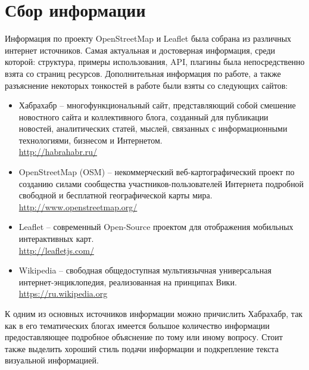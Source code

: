 \documentclass[a4paper, 14pt]{extreport}
\begin{document}
    \chapter{Сбор информации}
    Информация по проекту OpenStreetMap и Leaflet была собрана из различных
    интернет источников. Самая актуальная и достоверная информация, среди
    которой: структура, примеры использования, API, плагины была
    непосредственно взята со страниц ресурсов. Дополнительная информация по
    работе, а также разъяснение некоторых тонкостей в работе были взяты со
    следующих сайтов:
    \begin{itemize}
        \item Хабрахабр -- многофункциональный сайт, представляющий собой
            смешение новостного сайта и коллективного блога, созданный для
            публикации новостей, аналитических статей, мыслей, связанных с
            информационными технологиями, бизнесом и Интернетом.\\
            \url{http://habrahabr.ru/}
        \item OpenStreetMap (OSM) -- некоммерческий веб-картографический проект
            по созданию силами сообщества участников-пользователей Интернета
            подробной свободной и бесплатной географической карты мира.\\
            \url{http://www.openstreetmap.org/}
        \item Leaflet -- современный Open-Source проектом для отображения
            мобильных интерактивных карт.\\
            \url{http://leafletjs.com/}
        \item Wikipedia -- свободная общедоступная мультиязычная
            универсальная ин\-тер\-нет-энциклопедия, реализованная на принципах
            Вики.\\
            \url{https://ru.wikipedia.org}
    \end{itemize}
    
    К одним из основных источников информации можно причислить Хабрахабр, так
    как в его тематических блогах имеется большое количество информации
    предоставляющее подробное объяснение по тому или иному вопросу. Стоит также
    выделить хороший стиль подачи информации и подкрепление текста визуальной
    информацией.
\end{document}
